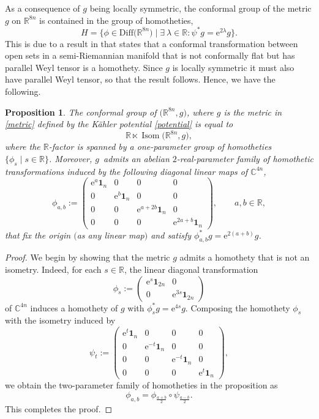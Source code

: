 \documentclass[pdftex]{sigma}
\numberwithin{equation}{section}
\newtheorem{Proposition}[Theorem]{Proposition}
 { \theoremstyle{definition}
\newtheorem{Definition}[Theorem]{Definition}
\newtheorem{Note}[Theorem]{Note}
\newtheorem{Example}[Theorem]{Example}
\newtheorem{Remark}[Theorem]{Remark} }
\DeclareMathOperator{\Iso}{\mathrm{Isom}}
\newcommand{\C}{\ensuremath{\mathbb{C}}}
\newcommand{\1}{\mathbf{1}}
\newcommand{\e}{\mathrm{e}}
\newcommand{\rr}{\mathbb{R}}
\newcommand{\+}{\oplus}
\renewcommand{\=}{\equiv}
\newcommand{\R}{\mathbb{R}}
\newcommand{\belabel}[1]{\begin{equation}\label{#1}}
\begin{document}
As a consequence of $g$ being locally symmetric, the conformal group of the metric $g$ on $\rr^{8n}$ is contained in the group of homotheties,
\[H=\bigl\{ \phi\in \mathrm{Diff}\bigl(\R^{8n}\bigr)\mid \exists\ \lambda\in \rr\colon \psi^*g=\e^{2\lambda}g\bigr\}.\]
This is due to a result in \cite[Proposition 2.1]{CahenKerbrat77} that states that a conformal transformation between open sets in a semi-Riemannian manifold that is not conformally flat but has parallel Weyl tensor is a homothety. Since $g$ is locally symmetric it must also have parallel Weyl tensor, so that the result follows. Hence, we have the following.

\begin{Proposition}
The conformal group of $\bigl(\R^{8n},g\bigr)$, where $g$ is the metric in \eqref{metric} defined by the K\"{a}hler potential \eqref{potential} is equal to
\[\R\ltimes \Iso\bigl(\R^{8n},g\bigr),
\]
where the $\R$-factor is spanned by a one-parameter group of homotheties $\{\phi_s\mid s\in \R\}$.
Moreover, $g$~admits an abelian $2$-real-parameter family of homothetic transformations induced by the following diagonal linear maps of $\C^{4n}$,
\belabel{chomoth}\phi_{a,b}:=
\begin{pmatrix} \e^{a}\1_{n} &0&0&0\\ 0& \e^{b} \1_{n}&0&0 \\
0&0& \e^{a+2b} \1_{n}&0\\
0&0&0&\e^{2a+b}\1_{n}
\end{pmatrix},\qquad a,b\in \R,\end{equation}
that fix the origin $($as any linear map$)$ and satisfy $\phi_{a,b}^*g=\e^{2(a+b)}g$.

\end{Proposition}
\begin{proof}
We begin by showing that the metric $g$ admits a homothety that is not an isometry.
Indeed, for each $s\in \R$, the linear diagonal transformation
\[\phi_s:=\begin{pmatrix} \e^{s}\1_{2n} &0\\ 0& \e^{3s}\1_{2n}\end{pmatrix}\]
of $\C^{4n}$ induces a homothety of $g$ with $\phi_s^*g=\e^{4s}g$.
Composing the homothety $\phi_s$ with the isometry induced by
\[\psi_t:=\begin{pmatrix} \e^{t}\1_{n} &0&0&0\\ 0& \e^{-t} \1_{n}&0&0 \\
0&0& \e^{-t} \1_{n}&0\\
0&0&0&\e^{t}\1_{n}
\end{pmatrix},\]
we obtain the {two-parameter} family of homotheties in the proposition as
\[\phi_{a,b}= \phi_{\tfrac{a+b}{2}} \circ \psi_{\tfrac{a-b}{2}}. \]
This completes the proof.
\end{proof}
\end{document}
